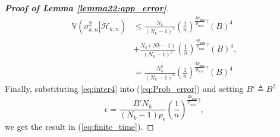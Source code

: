 \documentclass[lettersize,journal]{IEEEtran}
\begin{document}
\begin{appendices}
\begin{proof}[\textbf{Proof of Lemma \ref{lemma22:app_error}}]
\begin{align}
\label{eq:inter4}
   \mathbb{V}(\left. \sigma_{k,n}^2\right|\widetilde{\mathcal{H}}_{k,n}) \nonumber
   & \leq\frac{N_{k}}{(N_k-1)^2}\left(\frac{1}{n}\right)^{\frac{4p_{\min}}{p_{\max}}\gamma}(B)^4\nonumber\\
&+\frac{N_k(Nk-1) }{(N_k-1)^2}\left(\frac{1}{n}\right)^{\frac{4p_{\min}}{p_{\max}}\gamma}(B)^4, \nonumber\\
&=\frac{N_k^2 }{(N_k-1)^2}\left(\frac{1}{n}\right)^{\frac{4p_{\min}}{p_{\max}}\gamma}(B)^4
\end{align}
Finally, substituting \eqref{eq:inter4} into  (\ref{eq:Prob_error}) and setting $B' \triangleq B^2$
$$\epsilon=\frac{B'N_k}{(N_k-1)p_{\epsilon}}\left(\frac{1}{n}\right)^{\frac{2p_{\min}}{p_{\max}}\gamma}, $$ we get the result in (\ref{eq:finite_time}). 
\end{proof}
\end{appendices}












\end{document}
